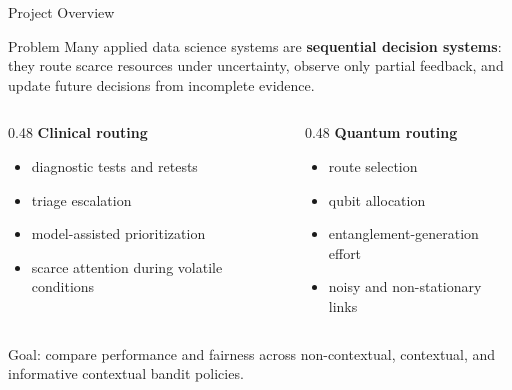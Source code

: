\documentclass[aspectratio=169,10pt]{beamer}
\begin{document}
\begin{frame}{Project Overview}
\begin{block}{Problem}
Many applied data science systems are \textbf{sequential decision systems}: they route scarce resources under uncertainty, observe only partial feedback, and update future decisions from incomplete evidence.
\end{block}

\begin{columns}[T]
\begin{column}{0.48\textwidth}
\textbf{Clinical routing}
\begin{itemize}
    \item diagnostic tests and retests
    \item triage escalation
    \item model-assisted prioritization
    \item scarce attention during volatile conditions
\end{itemize}
\end{column}
\begin{column}{0.48\textwidth}
\textbf{Quantum routing}
\begin{itemize}
    \item route selection
    \item qubit allocation
    \item entanglement-generation effort
    \item noisy and non-stationary links
\end{itemize}
\end{column}
\end{columns}

\vspace{0.4em}
\alert{Goal:} compare performance and fairness across non-contextual, contextual, and informative contextual bandit policies.
\end{frame}
\end{document}
